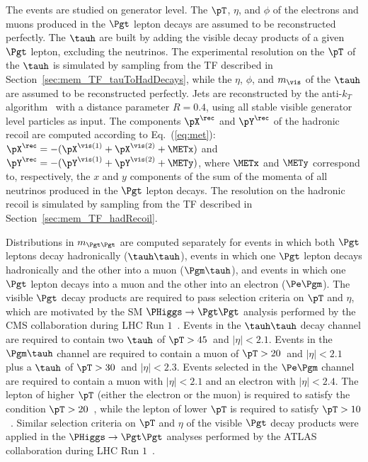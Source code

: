 The events are studied on generator level.
The $\pT$, $\eta$, and $\phi$ of the electrons and muons produced in the $\Pgt$ lepton decays
are assumed to be reconstructed perfectly.
The $\tauh$ are built by adding the visible decay products of a given $\Pgt$ lepton, excluding the neutrinos.
The experimental resolution on the $\pT$ of the $\tauh$ is simulated by sampling from the TF described in Section~\ref{sec:mem_TF_tauToHadDecays},
while the $\eta$, $\phi$, and $m_{\vis}$ of the $\tauh$ are assumed to be reconstructed perfectly.
Jets are reconstructed by the anti-$k_{T}$ algorithm~\cite{AntiKT} with a distance parameter $R = 0.4$,
using all stable visible generator level particles as input.
The components $\pX^{\rec}$ and $\pY^{\rec}$ of the hadronic recoil are computed according to Eq.~(\ref{eq:met}):
$\pX^{\rec} = -( \pX^{\vis(1)} + \pX^{\vis(2)} + \METx )$
and
$\pY^{\rec} = -( \pY^{\vis(1)} + \pY^{\vis(2)} + \METy )$,
where $\METx$ and $\METy$ correspond to, respectively, the $x$ and $y$ components of the sum of the momenta of all neutrinos produced in the $\Pgt$ lepton decays.
The resolution on the hadronic recoil is simulated by sampling from the TF described in Section~\ref{sec:mem_TF_hadRecoil}.

Distributions in $m_{\Pgt\Pgt}$ are computed separately for events in which 
both $\Pgt$ leptons decay hadronically ($\tauh\tauh$), 
events in which one $\Pgt$ lepton decays hadronically and the other into a muon ($\Pgm\tauh$),
and events in which one $\Pgt$ lepton decays into a muon and the other into an electron ($\Pe\Pgm$).
The visible $\Pgt$ decay products are required to pass selection criteria on $\pT$ and $\eta$,
which are motivated by the SM $\PHiggs \to \Pgt\Pgt$ analysis performed by the CMS collaboration during LHC Run $1$~\cite{HIG-13-004}.
Events in the $\tauh\tauh$ decay channel are required to contain
two $\tauh$ of $\pT > 45$~\GeV and $\vert\eta\vert < 2.1$.
Events in the $\Pgm\tauh$ channel
are required to contain a muon of $\pT > 20$~\GeV and $\vert\eta\vert < 2.1$ plus a $\tauh$ of $\pT > 30$~\GeV and $\vert\eta\vert < 2.3$.
Events selected in the $\Pe\Pgm$ channel are required to contain a muon with $\vert\eta\vert < 2.1$ and an electron with $\vert\eta\vert < 2.4$.
The lepton of higher $\pT$ (either the electron or the muon) is required to satisfy the condition $\pT > 20$~\GeV,
while the lepton of lower $\pT$ is required to satisfy $\pT > 10$~\GeV.
Similar selection criteria on $\pT$ and $\eta$ of the visible $\Pgt$ decay products were applied in the $\PHiggs \to \Pgt\Pgt$
analyses performed by the ATLAS
collaboration during LHC Run $1$~\cite{ATLAS_HiggsTauTau_SM,ATLAS_HiggsTauTau_MSSM}.

